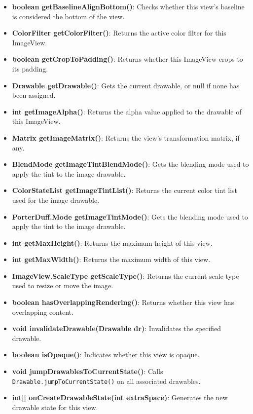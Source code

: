 \documentclass{report}
\begin{document}
\begin{itemize}
\begin{itemize}
                \item \textbf{boolean getBaselineAlignBottom()}: Checks whether this view's baseline is considered the bottom of the view.
                \item \textbf{ColorFilter getColorFilter()}: Returns the active color filter for this ImageView.
                \item \textbf{boolean getCropToPadding()}: Returns whether this ImageView crops to its padding.
                \item \textbf{Drawable getDrawable()}: Gets the current drawable, or null if none has been assigned.
                \item \textbf{int getImageAlpha()}: Returns the alpha value applied to the drawable of this ImageView.
                \item \textbf{Matrix getImageMatrix()}: Returns the view's transformation matrix, if any.
                \item \textbf{BlendMode getImageTintBlendMode()}: Gets the blending mode used to apply the tint to the image drawable.
                \item \textbf{ColorStateList getImageTintList()}: Returns the current color tint list used for the image drawable.
                \item \textbf{PorterDuff.Mode getImageTintMode()}: Gets the blending mode used to apply the tint to the image drawable.
                \item \textbf{int getMaxHeight()}: Returns the maximum height of this view.
                \item \textbf{int getMaxWidth()}: Returns the maximum width of this view.
                \item \textbf{ImageView.ScaleType getScaleType()}: Returns the current scale type used to resize or move the image.
                \item \textbf{boolean hasOverlappingRendering()}: Returns whether this view has overlapping content.
                \item \textbf{void invalidateDrawable(Drawable dr)}: Invalidates the specified drawable.
                \item \textbf{boolean isOpaque()}: Indicates whether this view is opaque.
                \item \textbf{void jumpDrawablesToCurrentState()}: Calls \texttt{Drawable.jumpToCurrentState()} on all associated drawables.
                \item \textbf{int[] onCreateDrawableState(int extraSpace)}: Generates the new drawable state for this view.

\end{itemize}
\end{itemize}
\end{document}
